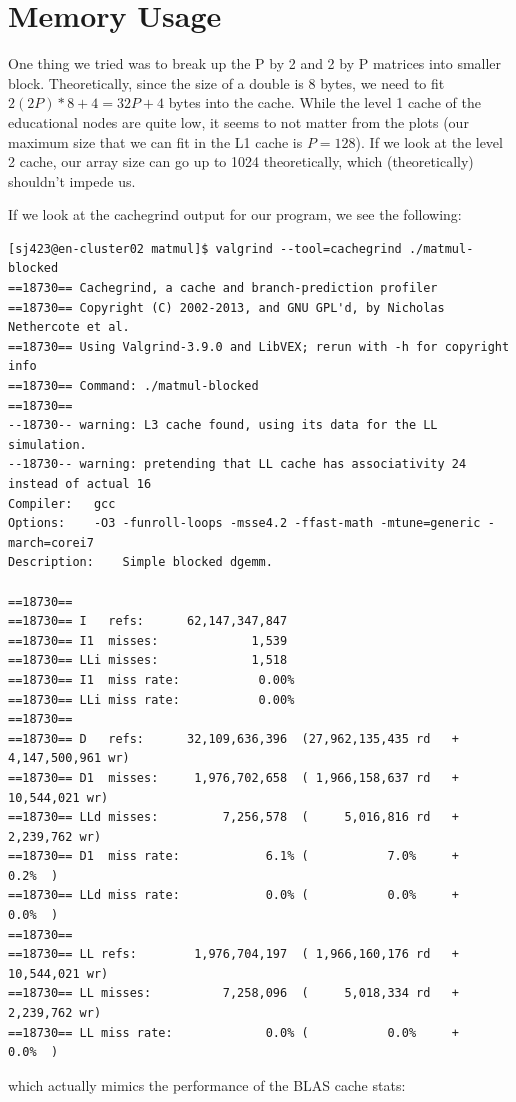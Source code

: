 \documentclass{article}
\begin{document}
    \section{Memory Usage}

    One thing we tried was to break up the P by 2 and 2 by P matrices into smaller block. Theoretically, since the size of a double is 8 bytes, we need to fit
    $2(2P)*8 + 4 = 32P + 4$ bytes into the cache. While the level 1 cache of the educational nodes are quite low, it seems to not matter from the plots (our maximum
    size that we can fit in the L1 cache is $P=128$). If we look at the level 2 cache, our array size can go up to 1024 theoretically, which (theoretically) shouldn't
    impede us.

    If we look at the cachegrind output for our program, we see the following:
    \begin{lstlisting}
[sj423@en-cluster02 matmul]$ valgrind --tool=cachegrind ./matmul-blocked
==18730== Cachegrind, a cache and branch-prediction profiler
==18730== Copyright (C) 2002-2013, and GNU GPL'd, by Nicholas Nethercote et al.
==18730== Using Valgrind-3.9.0 and LibVEX; rerun with -h for copyright info
==18730== Command: ./matmul-blocked
==18730== 
--18730-- warning: L3 cache found, using its data for the LL simulation.
--18730-- warning: pretending that LL cache has associativity 24 instead of actual 16
Compiler:	gcc
Options:	-O3 -funroll-loops -msse4.2 -ffast-math -mtune=generic -march=corei7
Description:	Simple blocked dgemm.

==18730== 
==18730== I   refs:      62,147,347,847
==18730== I1  misses:             1,539
==18730== LLi misses:             1,518
==18730== I1  miss rate:           0.00%
==18730== LLi miss rate:           0.00%
==18730== 
==18730== D   refs:      32,109,636,396  (27,962,135,435 rd   + 4,147,500,961 wr)
==18730== D1  misses:     1,976,702,658  ( 1,966,158,637 rd   +    10,544,021 wr)
==18730== LLd misses:         7,256,578  (     5,016,816 rd   +     2,239,762 wr)
==18730== D1  miss rate:            6.1% (           7.0%     +           0.2%  )
==18730== LLd miss rate:            0.0% (           0.0%     +           0.0%  )
==18730== 
==18730== LL refs:        1,976,704,197  ( 1,966,160,176 rd   +    10,544,021 wr)
==18730== LL misses:          7,258,096  (     5,018,334 rd   +     2,239,762 wr)
==18730== LL miss rate:             0.0% (           0.0%     +           0.0%  )
    \end{lstlisting}

    which actually mimics the performance of the BLAS cache stats:
\end{document}
